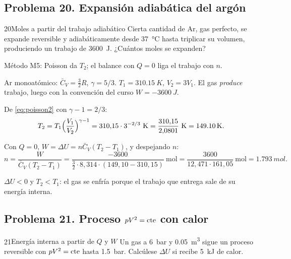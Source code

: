 \subsection{Problema 20. Expansión adiabática del argón}
\begin{problema}{20}{Moles a partir del trabajo adiabático}
Cierta cantidad de Ar, gas perfecto, se expande reversible y adiabáticamente desde \SI{37}{\celsius} hasta
triplicar su volumen, produciendo un trabajo de \SI{3600}{J}. ¿Cuántos moles se expanden?
\end{problema}

\begin{resolucion}
\idea Método M5: Poisson da $T_2$; el balance con $Q=0$ liga el trabajo con $n$.

 Ar monoatómico: $\bar C_V=\tfrac32R$, $\gamma=5/3$. $T_1=\SI{310,15}{K}$, $V_2=3V_1$. El gas
\emph{produce} trabajo, luego con la convención del curso $W=-\SI{3600}{J}$.

 De \eqref{eq:poisson2} con $\gamma-1=2/3$:
\[
  T_2=T_1\Bigl(\frac{V_1}{V_2}\Bigr)^{\gamma-1}=310{,}15\cdot3^{-2/3}\ \mathrm{K}
     =\frac{310{,}15}{2{,}0801}\ \mathrm{K}=\SI{149,10}{K}.
\]

 Con $Q=0$, $W=\Delta U=n\bar C_V(T_2-T_1)$, y despejando $n$:
\[
  n=\frac{W}{\bar C_V(T_2-T_1)}=\frac{-3600}{\tfrac32\cdot8{,}314\cdot(149{,}10-310{,}15)}\ \mathrm{mol}
   =\frac{3600}{12{,}471\cdot161{,}05}\ \mathrm{mol}=\boxed{\SI{1,793}{mol}}.
\]

 $\Delta U<0$ y $T_2<T_1$: el gas se enfría porque el trabajo que entrega sale de su
energía interna.
\end{resolucion}

\subsection{Problema 21. Proceso \texorpdfstring{$pV^2=\mathrm{cte}$}{pV2 = cte} con calor}
\begin{problema}{21}{Energía interna a partir de $Q$ y $W$}
Un gas a \SI{6}{bar} y \SI{0,05}{m^3} sigue un proceso reversible con $pV^2=\mathrm{cte}$ hasta \SI{1,5}{bar}. Calcúlese
$\Delta U$ si recibe \SI{5}{kJ} de calor.
\end{problema}

